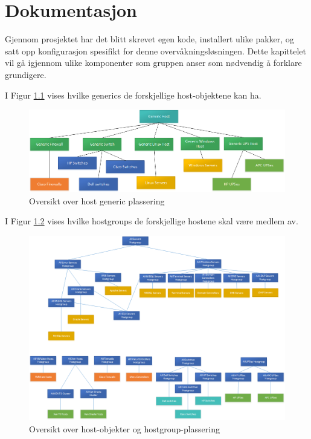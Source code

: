 \chapter{Dokumentasjon}
Gjennom prosjektet har det blitt skrevet egen kode, installert ulike pakker, og satt opp konfigurasjon spesifikt for denne overvåkningsløsningen. Dette kapittelet vil gå igjennom ulike komponenter som gruppen anser som nødvendig å forklare grundigere.
\clearpage

I Figur \ref{hostfigur} vises hvilke generics de forskjellige host-objektene kan ha.

	\begin{figure}[H]
	    \centering
	    \includegraphics[scale=0.5]{img/host}
	    \caption{Oversikt over host generic plassering}
	    \label{hostfigur}
	\end{figure}

	I Figur \ref{hostgroupfigur} vises hvilke hostgroups de forskjellige hostene skal være medlem av.

\begin{figure}[H]
    \centering
    \includegraphics[scale=0.5]{img/hostgroups}
    \caption{Oversikt over host-objekter og hostgroup-plassering}
    \label{hostgroupfigur}
\end{figure}

